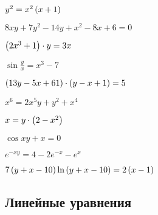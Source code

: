 \begin{enumsols}
		\label{sol:firstorder:homogeneous_cauchy}
		\item \( y^2 = x^2 \left( x + 1 \right) \) %
		\item \( 8xy + 7y^2 - 14y + x^2 - 8x + 6 = 0 \) %
		\item \( \left( 2x^3 + 1 \right) \cdot y = 3x \) %
		\item \( \sin{\frac{y}{x}} = x^3 - 7 \) %
		\item \( \left( 13y - 5x + 61 \right) \cdot \left( y - x + 1 \right) = 5 \) %
		\item \( x^6 = 2x^5 y + y^2 + x^4 \) %
		\item \( x = y \cdot \left( 2 - x^2 \right) \) %
		\item \( \cos{xy} + x = 0 \) %
		\item \( e^{-xy} = 4 - 2e^{-x} - e^{x} \) %
		\item \( 7 \left( y + x - 10 \right)\ln\left( y + x - 10 \right) = 2 \left( x - 1 \right) \) %

	\end{enumsols}

\subsection*{Линейные уравнения}

